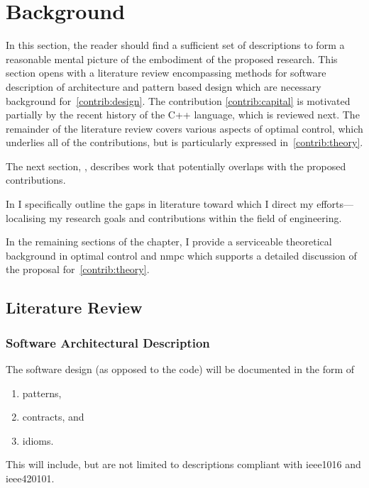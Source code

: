 %
\chapter{Background}%
\label{chap:background}

In this section, the reader should find a sufficient set of descriptions to form
a reasonable mental picture of the embodiment of the proposed research. This
section opens with a literature review encompassing methods for software
description of architecture and pattern based design which are necessary
background for~\ref{contrib:design}. The contribution \ref{contrib:capital} is
motivated partially by the recent history of the C++ language, which is reviewed
next. The remainder of the literature review covers various aspects of optimal
control, which underlies all of the contributions, but is particularly expressed
in~\ref{contrib:theory}.

The next section, , describes work that potentially overlaps
with the proposed contributions.

In  I specifically outline the gaps in literature
toward which I direct my efforts—localising my research goals and contributions
within the field of engineering.

In the remaining sections of the chapter, I provide a serviceable theoretical
background in optimal control and \ac{nmpc} which supports a detailed discussion
of the proposal for~\ref{contrib:theory}.




\section{Literature Review}%
\label{sec:lit-review}


\subsection{Software Architectural Description}


The software design (as opposed to the code) will be documented in the form of
%
\begin{enumerate}
  \item patterns,
  \item contracts, and
  \item idioms.
\end{enumerate}
%
This will include, but are not limited to descriptions compliant with
\acl{ieee1016} and \acl{ieee420101}.

